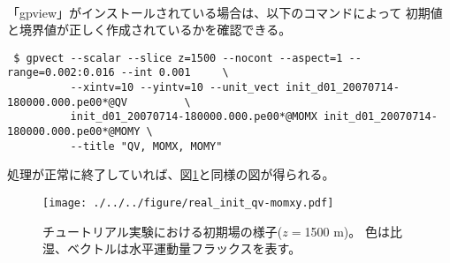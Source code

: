 \vspace{1cm}
 \hrulefill \\
「gpview」がインストールされている場合は、以下のコマンドによって
初期値と境界値が正しく作成されているかを確認できる。

\begin{verbatim}
 $ gpvect --scalar --slice z=1500 --nocont --aspect=1 --range=0.002:0.016 --int 0.001     \
          --xintv=10 --yintv=10 --unit_vect init_d01_20070714-180000.000.pe00*@QV         \
          init_d01_20070714-180000.000.pe00*@MOMX init_d01_20070714-180000.000.pe00*@MOMY \
          --title "QV, MOMX, MOMY"
\end{verbatim}
処理が正常に終了していれば、図\ref{fig:init}と同様の図が得られる。

\begin{figure}[h]
\begin{center}
  \texttt{[image: ./../../figure/real\_init\_qv-momxy.pdf]}\\
  \caption{チュートリアル実験における初期場の様子($z=$1500 m)。
           色は比湿、ベクトルは水平運動量フラックスを表す。}
  \label{fig:init}
\end{center}
\end{figure}
